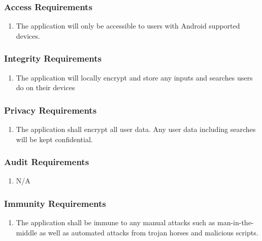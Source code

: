\documentclass[titlepage]{article}
\begin{document}
\subsubsection{Access Requirements}
\label{ssub:access_requirements}
\begin{enumerate}[{SR}1. ]
	\item The application will only be accessible to users with Android supported devices.
\end{enumerate}

\subsubsection{Integrity Requirements}
\label{ssub:integrity_requirements}
\begin{enumerate}[{SR}1. ]
    \item The application will locally encrypt and store any inputs and searches users do on their
    devices
\end{enumerate}

\subsubsection{Privacy Requirements}
\label{ssub:privacy_requirements}
\begin{enumerate}[{SR}1. ]
    \item The application shall encrypt all user data. Any user data including searches will be kept
    confidential.
\end{enumerate}

\subsubsection{Audit Requirements}
\label{ssub:audit_requirements}
\begin{enumerate}[{SR}1. ]
	\item N/A
\end{enumerate}

\subsubsection{Immunity Requirements}
\label{ssub:immunity_requirements}
\begin{enumerate}[{SR}1. ]
    \item The application shall be immune to any manual attacks such as man-in-the-middle as well as
    automated attacks from trojan horses and malicious scripts.
\end{enumerate}
\end{document}
